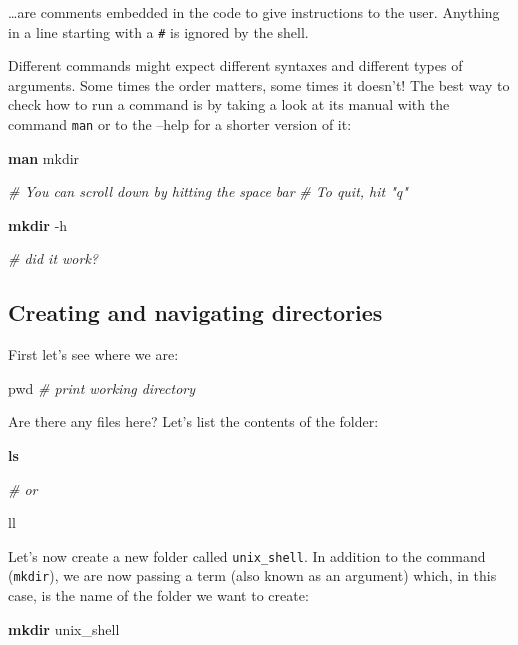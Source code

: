 \documentclass[
]{book}
\newenvironment{Shaded}{\begin{snugshade}}{\end{snugshade}}
\newcommand{\AttributeTok}[1]{\textcolor[rgb]{0.13,0.29,0.53}{#1}}
\newcommand{\BuiltInTok}[1]{#1}
\newcommand{\CommentTok}[1]{\textcolor[rgb]{0.56,0.35,0.01}{\textit{#1}}}
\newcommand{\ExtensionTok}[1]{#1}
\newcommand{\FunctionTok}[1]{\textcolor[rgb]{0.13,0.29,0.53}{\textbf{#1}}}
\newcommand{\NormalTok}[1]{#1}
\begin{document}
\ldots are comments embedded in the code to give instructions to the user.
Anything in a line starting with a \texttt{\#} is ignored by the shell.

Different commands might expect different syntaxes and different types of arguments. Some times the order matters, some times it doesn't! The best way to check how to run a command is by taking a look at its manual with the command \texttt{man} or to the --help for a shorter version of it:

\begin{Shaded}
\begin{Highlighting}[]
\FunctionTok{man}\NormalTok{ mkdir}

\CommentTok{\# You can scroll down by hitting the space bar}
\CommentTok{\# To quit, hit "q"}

\FunctionTok{mkdir} \AttributeTok{{-}h}

\CommentTok{\# did it work?}
\end{Highlighting}
\end{Shaded}

\subsection{Creating and navigating directories}\label{creating-and-navigating-directories}

First let's see where we are:

\begin{Shaded}
\begin{Highlighting}[]
\BuiltInTok{pwd}  \CommentTok{\# print working directory}
\end{Highlighting}
\end{Shaded}

Are there any files here? Let's list the contents of the folder:

\begin{Shaded}
\begin{Highlighting}[]
\FunctionTok{ls}

\CommentTok{\# or }

\ExtensionTok{ll}
\end{Highlighting}
\end{Shaded}

Let's now create a new folder called \texttt{unix\_shell}. In addition to the command (\texttt{mkdir}), we are now passing a term (also known as an argument) which, in this case, is the name of the folder we want to create:

\begin{Shaded}
\begin{Highlighting}[]
\FunctionTok{mkdir}\NormalTok{ unix\_shell}
\end{Highlighting}
\end{Shaded}
\end{document}
